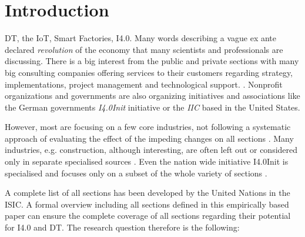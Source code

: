 \section{Introduction}\label{Introduction}
\ac{DT}, the \ac{IoT}, Smart Factories,
\ac{I4.0}. Many words describing a vague ex ante declared
\emph{revolution} of the economy that many scientists and professionals are discussing.
There is a big interest from the public and private sections with many big consulting companies offering services to their customers regarding strategy, implementations, project management and technological support.
\cite{westerman2011digital,mckinsey-nine-questions,bcg-dt,accenture-dt:2015}.
Nonprofit organizations and governments are also organizing initiatives and associations like the German governments \emph{\ac{I4.0Init}} \cite{i40-web} initiative or the \emph{\ac{IIC}} \cite{iic-web} based in the United States.

However, most are focusing on a few core industries, not following a systematic approach of evaluating the effect of the impeding changes on all sections \cite{westerman2011digital, pwc2016survey}. 
Many industries, e.g. construction, although interesting, are often left out or considered only in separate specialised sources \cite{rolandbergerBauwirtschaft:2016}. 
Even the nation wide initiative \acl{I4.0Init} is specialised and focuses only on a subset of the whole variety of sections \cite{umsetzungsstrategie:2015}. 

A complete list of all sections has been developed by the United Nations in the \ac{ISIC}\cite{ISIC:2008}. A formal overview including all sections defined in this empirically based paper can ensure the complete coverage of all sections regarding their potential for \ac{I4.0} and \ac{DT}. The research question therefore is the following:

